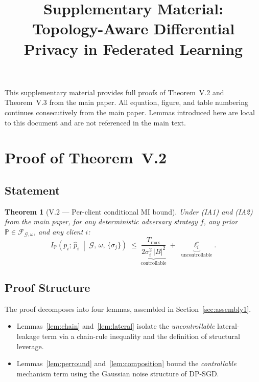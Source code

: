 \documentclass[letterpaper,journal]{IEEEtran}
\newtheorem*{theoremstar}{Theorem}
\newcommand{\FAM}{\mathcal{F}}
\newcommand{\TOPO}{\mathcal{G}}
\newcommand{\Tmax}{T_{\max}}
\begin{document}
\title{Supplementary Material:\\
Topology-Aware Differential Privacy in Federated Learning}

\maketitle

\noindent This supplementary material provides full proofs of Theorem~V.2
and Theorem~V.3 from the main paper. All equation, figure, and
table numbering continues consecutively from the main paper.
Lemmas introduced here are local to this document and are not
referenced in the main text.

\appendix

\section{Proof of Theorem~V.2}
\label{app:thm1}

\subsection{Statement}

\begin{theoremstar}[V.2 \textnormal{---} Per-client conditional
MI bound]
Under (IA1) and (IA2) from the main paper, for any deterministic
adversary strategy $f$, any prior $\mathbb{P} \in
\FAM_{\TOPO,\omega}$, and any client $i$:
\begin{equation}
I_{\mathbb{P}}\!\left(p_i;\,\hat{p}_i \;\middle|\;
\TOPO,\,\omega,\,\{\sigma_j\}\right)
\;\leq\;
\underbrace{\frac{\Tmax}{2\sigma_i^2\,|B|^2}}_{\text{controllable}}
\;+\;
\underbrace{\ell_i^\circ}_{\text{uncontrollable}}.
\label{eq:thm1-supp}
\end{equation}
\end{theoremstar}

\subsection{Proof Structure}

\noindent The proof decomposes into four lemmas, assembled in
Section~\ref{sec:assembly1}.

\begin{itemize}
\item Lemmas~\ref{lem:chain} and~\ref{lem:lateral} isolate the
      \emph{uncontrollable} lateral-leakage term via a chain-rule
      inequality and the definition of structural leverage.
\item Lemmas~\ref{lem:perround} and~\ref{lem:composition} bound
      the \emph{controllable} mechanism term using the Gaussian
      noise structure of DP-SGD.\medskip
\end{itemize}
\end{document}

